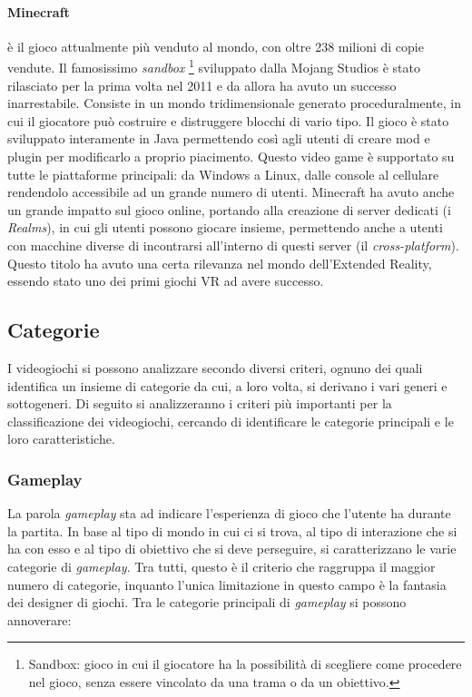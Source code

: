         \paragraph{Minecraft} è il gioco attualmente più venduto al mondo, con oltre 238 milioni di copie vendute. Il famosissimo \textit{sandbox}
            \footnote{Sandbox: gioco in cui il giocatore ha la possibilità di scegliere come procedere nel gioco, senza essere vincolato da una trama o da un obiettivo.}
            sviluppato dalla Mojang Studios è stato
            rilasciato per la prima volta nel 2011 e da allora ha avuto un successo inarrestabile. Consiste in un mondo tridimensionale generato proceduralmente, in cui il giocatore
            può costruire e distruggere blocchi di vario tipo. Il gioco è stato sviluppato interamente in Java permettendo così agli utenti di creare mod e plugin per modificarlo
            a proprio piacimento. Questo video game è supportato su tutte le piattaforme principali: da Windows a Linux, dalle console al cellulare rendendolo accessibile ad un grande
            numero di utenti. Minecraft ha avuto anche un grande impatto sul gioco online, portando alla creazione di server dedicati (i \textit{Realms}), in cui gli utenti possono 
            giocare insieme, permettendo anche a utenti con macchine diverse di incontrarsi all'interno di questi server (il \textit{cross-platform}). Questo titolo ha avuto una 
            certa rilevanza nel mondo dell'Extended Reality, essendo stato uno dei primi giochi VR ad avere successo.

    \subsection{Categorie}\label{subsec:VideogiochiCategorie}
        I videogiochi si possono analizzare secondo diversi criteri, ognuno dei quali identifica un insieme di categorie da cui, a loro volta, si derivano i vari generi e sottogeneri.
        Di seguito si analizzeranno i criteri più importanti per la classificazione dei videogiochi, cercando di identificare le categorie principali e le loro caratteristiche.

        \subsubsection{Gameplay}
            La parola \textit{gameplay} sta ad indicare l'esperienza di gioco che l'utente ha durante la partita. In base al tipo di mondo in cui ci si trova, al tipo di interazione
            che si ha con esso e al tipo di obiettivo che si deve perseguire, si caratterizzano le varie categorie di \textit{gameplay}. Tra tutti, questo è il criterio che raggruppa 
            il maggior numero di categorie, inquanto l'unica limitazione in questo campo è la fantasia dei designer di giochi. Tra le categorie principali di \textit{gameplay} si possono
            annoverare:
            
